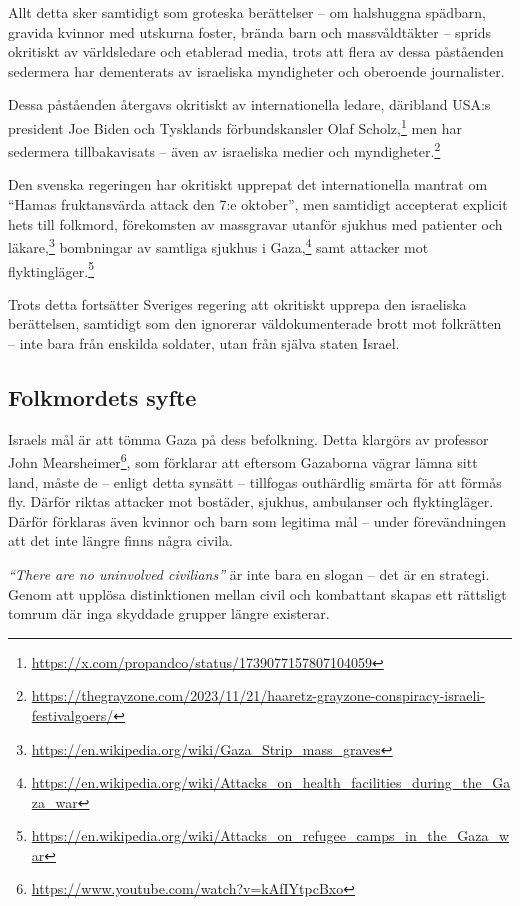 Allt detta sker samtidigt som groteska berättelser – om halshuggna spädbarn, gravida kvinnor med utskurna foster, brända barn och massvåldtäkter – sprids okritiskt av världsledare och etablerad media, trots att flera av dessa påståenden sedermera har dementerats av israeliska myndigheter och oberoende journalister.

Dessa påståenden återgavs okritiskt av internationella ledare, däribland USA:s president Joe Biden och Tysklands förbundskansler Olaf Scholz,\footnote{\url{https://x.com/propandco/status/1739077157807104059}} men har sedermera tillbakavisats – även av israeliska medier och myndigheter.\footnote{\url{https://thegrayzone.com/2023/11/21/haaretz-grayzone-conspiracy-israeli-festivalgoers/}}

Den svenska regeringen har okritiskt upprepat det internationella mantrat om \enquote{Hamas fruktansvärda attack den 7:e oktober}, men samtidigt accepterat explicit hets till folkmord, förekomsten av massgravar utanför sjukhus med patienter och läkare,\footnote{\url{https://en.wikipedia.org/wiki/Gaza_Strip_mass_graves}} bombningar av samtliga sjukhus i Gaza,\footnote{\url{https://en.wikipedia.org/wiki/Attacks_on_health_facilities_during_the_Gaza_war}} samt attacker mot flyktingläger.\footnote{\url{https://en.wikipedia.org/wiki/Attacks_on_refugee_camps_in_the_Gaza_war}}

Trots detta fortsätter Sveriges regering att okritiskt upprepa den israeliska berättelsen, samtidigt som den ignorerar väldokumenterade brott mot folkrätten – inte bara från enskilda soldater, utan från själva staten Israel.



\subsection{Folkmordets syfte}

Israels mål är att tömma Gaza på dess befolkning. Detta klargörs av professor John Mearsheimer\footnote{\url{https://www.youtube.com/watch?v=kAfIYtpcBxo}}, som förklarar att eftersom Gazaborna vägrar lämna sitt land, måste de – enligt detta synsätt – tillfogas outhärdlig smärta för att förmås fly. Därför riktas attacker mot bostäder, sjukhus, ambulanser och flyktingläger. Därför förklaras även kvinnor och barn som legitima mål – under förevändningen att det inte längre finns några civila.

\textit{“There are no uninvolved civilians”} är inte bara en slogan – det är en strategi. Genom att upplösa distinktionen mellan civil och kombattant skapas ett rättsligt tomrum där inga skyddade grupper längre existerar.

